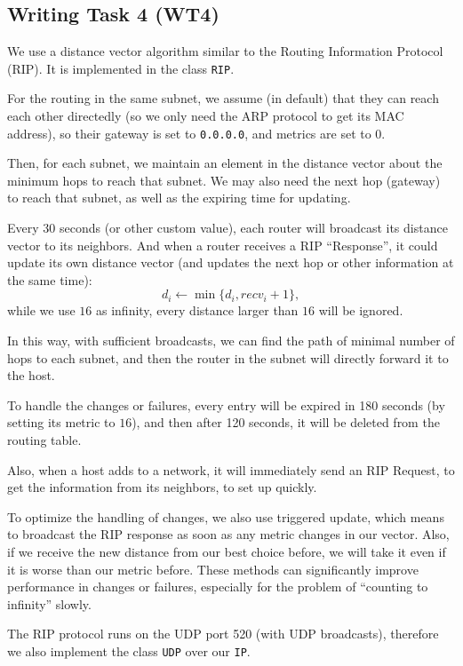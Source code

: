 \documentclass[a4paper]{article}
\begin{document}
  \subsection{Writing Task 4 (WT4)}

  We use a distance vector algorithm similar to the Routing Information Protocol (RIP). It is implemented in the class \texttt{RIP}.

  For the routing in the same subnet, we assume (in default) that they can reach each other directedly (so we only need the ARP protocol to get its MAC address), so their gateway is set to \texttt{0.0.0.0}, and metrics are set to $0$.

  Then, for each subnet, we maintain an element in the distance vector about the minimum hops to reach that subnet.
  We may also need the next hop (gateway) to reach that subnet, as well as the expiring time for updating.

  Every 30 seconds (or other custom value), each router will broadcast its distance vector to its neighbors.
  And when a router receives a RIP ``Response'', it could update its own distance vector (and updates the next hop or other information at the same time):
  $$d_i \gets \min\{d_i, \mathit{recv}_i + 1\},$$
  while we use $16$ as infinity, every distance larger than $16$ will be ignored.

  In this way, with sufficient broadcasts, we can find the path of minimal number of hops to each subnet, and then the router in the subnet will directly forward it to the host.

  To handle the changes or failures, every entry will be expired in 180 seconds (by setting its metric to $16$), and then after 120 seconds, it will be deleted from the routing table.

  Also, when a host adds to a network, it will immediately send an RIP Request, to get the information from its neighbors, to set up quickly.

  To optimize the handling of changes, we also use triggered update, which means to broadcast the RIP response as soon as any metric changes in our vector.
  Also, if we receive the new distance from our best choice before, we will take it even if it is worse than our metric before. These methods can significantly improve performance in changes or failures, especially for the problem of ``counting to infinity'' slowly.

  The RIP protocol runs on the UDP port 520 (with UDP broadcasts), therefore we also implement the class \texttt{UDP} over our \texttt{IP}.
\end{document}
